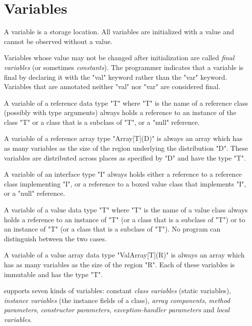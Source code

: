 
\chapter{Variables}\label{XtenVariables}

A variable is a storage location. All
variables are initialized with a value and cannot be observed
without
a value.

Variables whose value may not be changed after initialization
are called {\em final variables} (or sometimes {\em constants}).
The programmer indicates that a variable is final by declaring
it with the \xcd"val" keyword rather than the \xcd"var" keyword.
Variables that are annotated neither \xcd"val" nor \xcd"var"
are considered final.

A variable of a reference data type \xcd"T" where \xcd"T" is the name
of a reference class (possibly with type arguments) always holds a
reference to an instance of the class \xcd"T" or a class that is a
subclass of \xcd"T", or a \xcd"null" reference.

A variable of a reference array type \xcd"Array[T](D)" is always an
array which has as many variables as the size of the region underlying
the distribution \xcd"D". These variables are distributed across
places as specified by \xcd"D" and have the type \xcd"T".


A variable of an interface type \xcd"I" always holds either a
reference to a reference class implementing \xcd"I", or a reference to a
boxed value class that implements \xcd"I", or a \xcd"null"
reference.

A variable of a value data type \xcd"T" where \xcd"T" is the name of a
value class always holds a reference to an instance of \xcd"T" (or a
class that is a subclass of \xcd"T") or to an instance of \xcd"T" (or a
class that is a subclass of \xcd"T"). No program can distinguish
between the two cases.

A variable of a value array data type \xcd"ValArray[T](R)" is always an
array which has as many variables as the size of the region \xcd"R".
Each of these variables is immutable and has the type \xcd"T".

\Xten{} supports seven kinds of variables: constant {\em class
variables} (static variables), {\em instance variables} (the instance
fields of a class), {\em array components}, {\em method parameters},
{\em constructor parameters}, {\em exception-handler parameters} and
{\em local variables}.

